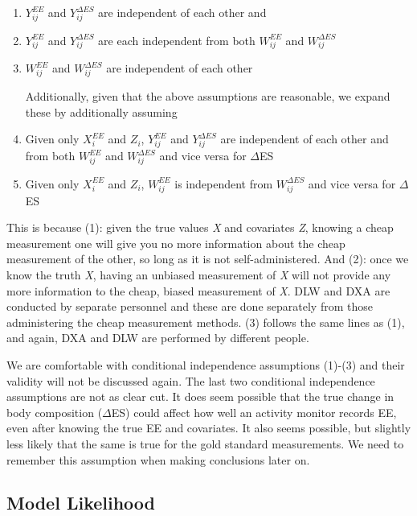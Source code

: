 \documentclass[11pt]{article}\usepackage[]{graphicx}\usepackage[]{color}
\begin{document}
\begin{enumerate}
\item
$Y_{ij}^{EE}$ and $Y_{ij}^{\Delta ES}$ are independent of each other and 
\item
$Y_{ij}^{EE}$ and $Y_{ij}^{\Delta ES}$ are each independent from both $W_{ij}^{EE}$ and $W_{ij}^{\Delta ES}$
\item
$W_{ij}^{EE}$ and $W_{ij}^{\Delta ES}$ are independent of each other

Additionally, given that the above assumptions are reasonable, we expand these by additionally assuming

\item
Given only $X_i^{EE}$ and $Z_i$, $Y_{ij}^{EE}$ and $Y_{ij}^{\Delta ES}$ are independent of each other and from both $W_{ij}^{EE}$ and $W_{ij}^{\Delta ES}$ and vice versa for $\Delta$ES
\item
Given only $X_i^{EE}$ and $Z_i$, $W_{ij}^{EE}$ is independent from $W_{ij}^{\Delta ES}$ and vice versa for $\Delta$ES

\end{enumerate}

 This is because  (1): given the true values \emph{X} and covariates \emph{Z}, knowing a cheap measurement one will give you no more information about the cheap measurement of the other, so long as it is not self-administered. And (2): once we know the truth \emph{X}, having an unbiased measurement of \emph{X} will not provide any more information to the cheap, biased measurement of \emph{X}. DLW and DXA are conducted by separate personnel and these are done separately from those administering the cheap measurement methods. (3) follows the same lines as (1), and again, DXA and DLW are performed by different people.

We are comfortable with conditional independence assumptions (1)-(3) and their validity will not be discussed again. The last two conditional independence assumptions are not as clear cut. It does seem possible that the true change in body composition ($\Delta$ES) could affect how well an activity monitor records EE, even after knowing the true EE and covariates. It also seems possible, but slightly less likely that the same is true for the gold standard measurements. We need to remember this assumption when making conclusions later on.

\subsection{Model Likelihood}
\end{document}
